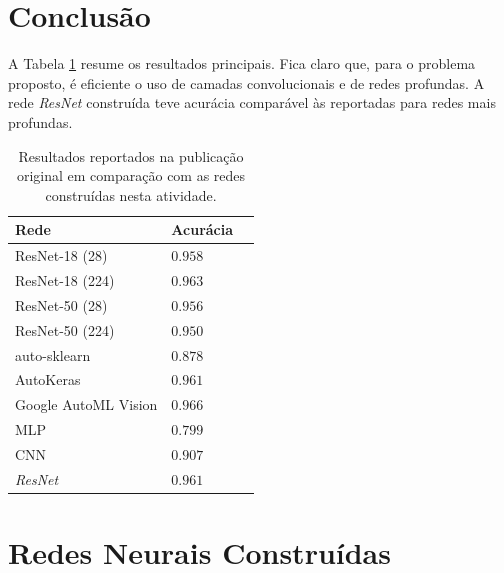 \documentclass[final,5p]{elsarticle}
\numberwithin{equation}{section}
\begin{document}
    \section{Conclusão}

    A Tabela \ref{tab:resultados_resumo} resume os resultados principais. Fica claro que, para o problema proposto, é eficiente o uso de camadas convolucionais e de redes profundas. A rede \emph{ResNet} construída teve acurácia comparável às reportadas para redes mais profundas.

    \begin{table}[h]
        \centering
        \begin{tabular}{l l c}
            \toprule
            \textbf{Rede} & \textbf{Acurácia} \\
            \midrule
            ResNet-18 (28) & $0.958$ \\
            ResNet-18 (224) & $0.963$ \\
            ResNet-50 (28) & $0.956$ \\
            ResNet-50 (224) & $0.950$ \\
            auto-sklearn & $0.878$ \\
            AutoKeras & $0.961$ \\
            Google AutoML Vision & $0.966$ \\
            \midrule
            MLP & $0.799$ \\
            CNN & $0.907$ \\
            \emph{ResNet} & $0.961$ \\
            \bottomrule
        \end{tabular}
        \caption{Resultados reportados na publicação original \cite{medmnistv2} em comparação com as redes construídas nesta atividade.}
        \label{tab:resultados_resumo}
    \end{table}

\appendix

    \section{Redes Neurais Construídas}
\end{document}
